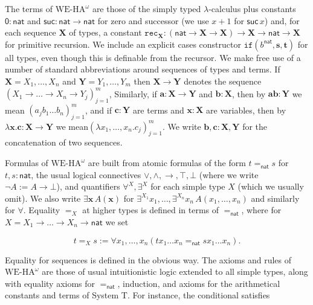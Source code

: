 The terms of $\mathrm{WE}\mbox{-}\mathrm{HA}^{\omega}$ are those of the simply typed $\lambda$-calculus plus constants $\mathsf{0}:\mathsf{nat}$ and $\mathsf{suc}:\mathsf{nat}\to\mathsf{nat}$ for zero and successor (we use $x+1$ for $\mathsf{suc}\,x$) and, for each sequence $\bm{X}$ of types, a constant $\bm{\mathtt{rec}}_{\bm{X}}:(\mathsf{nat}\to\bm{X}\to\bm{X})\to\bm{X}\to\mathsf{nat}\to\bm{X}$ for primitive recursion. We include an explicit cases constructor $\mathtt{if}({b^{\mathsf{nat}}},{\bm{s}},{\bm{t}})$ for all types, even though this is definable from the recursor. We make free use of a number of standard abbreviations around sequences of types and terms. If $\bm{X}=X_{1},\ldots,X_{n}$ and $\bm{Y}=Y_{1},\ldots,Y_{m}$ then $\bm{X}\to\bm{Y}$ denotes the sequence $(X_{1}\to\ldots\to X_{n}\to Y_{j})^{m}_{j=1}$, Similarly, if $\bm{a}:\bm{X}\to\bm{Y}$ and $\bm{b}:\bm{X}$, then by $\bm{a}\bm{b}:\bm{Y}$ we mean $(a_{j}b_{1}\ldots b_{n})^{m}_{j=1}$, and if $\bm{c}:\bm{Y}$ are terms and $\bm{x}:\bm{X}$ are variables, then by $\lambda\bm{x}.\bm{c}:\bm{X}\to\bm{Y}$ we mean$(\lambda x_{1},\ldots,x_{n}.c_{j})^{m}_{j=1}$. We write $\bm{b},\bm{c}:\bm{X},\bm{Y}$ for the concatenation of two sequences.\par
 
 
 
Formulas of $\mathrm{WE}\mbox{-}\mathrm{HA}^{\omega}$ are built from atomic formulas of the form $t=_{\mathsf{nat}}s$ for $t,s:\mathsf{nat}$, the usual logical connectives $\vee,\wedge,\to,\top,\bot$ (where we write $\neg A:=A\to\bot$), and quantifiers $\forall^{X},\exists^{X}$ for each simple type $X$ (which we usually omit). We also write $\exists\bm{x}\,A(\bm{x})$ for $\exists^{X_{1}}x_{1},\ldots,\exists^{X_{n}}x_{n}\,A(x_{1},\ldots,x_{n})$ and similarly for $\forall$. Equality $=_{X}$ at higher types is defined in terms of $=_{\mathsf{nat}}$, where for $X=X_{1}\to\ldots\to X_{n}\to\mathsf{nat}$ we set\par
  
\par  \quad  \[t=_{X}s:=\forall x_{1},\ldots,x_{n}(tx_{1}\ldots x_{n}=_{\mathsf{nat}}sx_{1}\ldots x_{n}).\]\quad  \quad  
  
Equality for sequences is defined in the obvious way. The axioms and rules of $\mathrm{WE}\mbox{-}\mathrm{HA}^{\omega}$ are those of usual intuitionistic logic extended to all simple types, along with equality axioms for $=_{\mathsf{nat}}$, induction, and axioms for the arithmetical constants and terms of System T. For instance, the conditional satisfies\par
  
